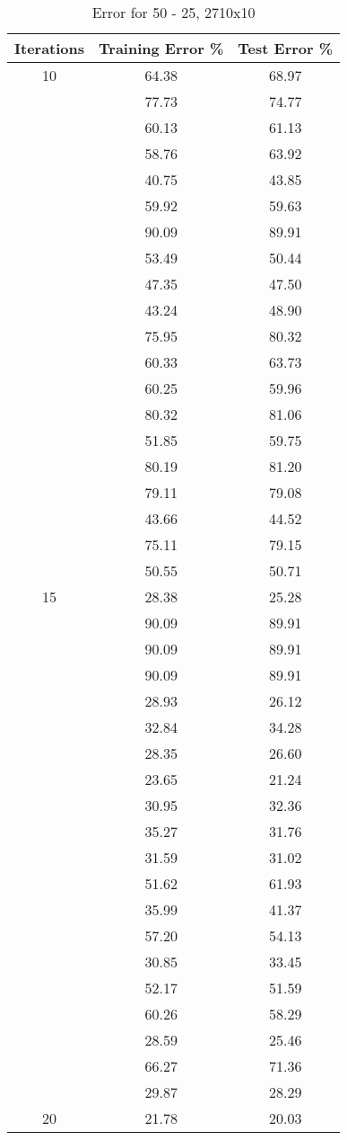 \documentclass[12pt]{article}
\begin{document}
\begin{table}[h]
	\begin{center}
		\caption{Error for 50 - 25, 2710x10}
		\label{tab:table2}
		\begin{tabular}{|c|c|c|}
			\hline
			\textbf{Iterations} & \textbf{Training Error \%} & \textbf{Test Error \%} \\
			\hline
			10 & 64.38 & 68.97\\
			& 77.73 & 74.77\\
			& 60.13 & 61.13\\
			& 58.76 & 63.92\\
			& 40.75 & 43.85\\
			& 59.92 & 59.63\\
			& 90.09 & 89.91\\
			& 53.49 & 50.44\\
			& 47.35 & 47.50\\
			& 43.24 & 48.90\\
			& 75.95 & 80.32\\
			& 60.33 & 63.73\\
			& 60.25 & 59.96\\
			& 80.32 & 81.06\\
			& 51.85 & 59.75\\
			& 80.19 & 81.20\\
			& 79.11 & 79.08\\
			& 43.66 & 44.52\\
			& 75.11 & 79.15\\
			& 50.55 & 50.71\\
			\hline
			15 & 28.38 & 25.28\\
			& 90.09 & 89.91\\
			& 90.09 & 89.91\\
			& 90.09 & 89.91\\
			& 28.93 & 26.12\\
			& 32.84 & 34.28\\
			& 28.35 & 26.60\\
			& 23.65 & 21.24\\
			& 30.95 & 32.36\\
			& 35.27 & 31.76\\
			& 31.59 & 31.02\\
			& 51.62 & 61.93\\
			& 35.99 & 41.37\\
			& 57.20 & 54.13\\
			& 30.85 & 33.45\\
			& 52.17 & 51.59\\
			& 60.26 & 58.29\\
			& 28.59 & 25.46\\
			& 66.27 & 71.36\\
			& 29.87 & 28.29\\
			\hline
			20 & 21.78 & 20.03 \\
			\hline
		\end{tabular}
	\end{center}
\end{table}
\end{document}
